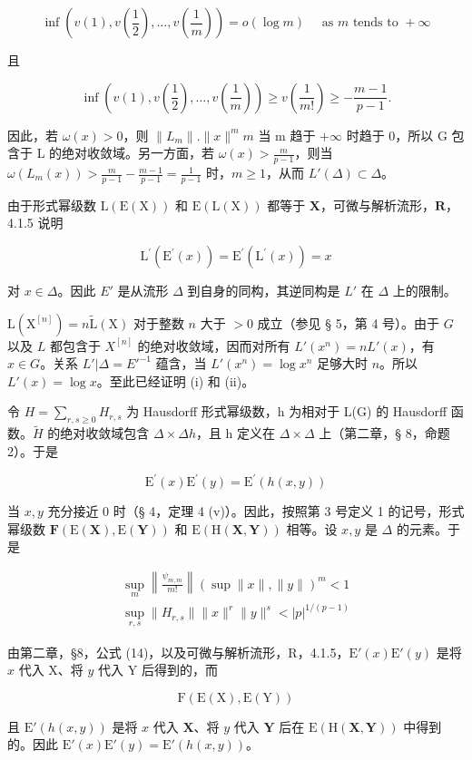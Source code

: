 \[
\inf \left(v (1), v \left(\frac {1}{2}\right), \dots , v \left(\frac {1}{m}\right)\right) = o (\log m) \quad \text { as   } m \text {   tends   to   } + \infty
\]

且

\[
\inf \left(v (1), v \left(\frac {1}{2}\right), \dots , v \left(\frac {1}{m}\right)\right) \geqslant v \left(\frac {1}{m !}\right) \geqslant - \frac {m - 1}{p - 1}.
\]

因此，若 \(\omega(x) > 0\)，则 \(\|L_m\|. \|x\|^m\)\(m\) 当 m 趋于  \(+\infty\) 时趋于 0，所以 G 包含于 L 的绝对收敛域。另一方面，若 \(\omega(x) > \frac{m}{p-1}\)，则当 \(\omega(L_m(x)) > \frac{m}{p-1} - \frac{m-1}{p-1} = \frac{1}{p-1}\) 时，\(m \geqslant 1\)，从而 \(L'(\Delta) \subset \Delta\)。

由于形式幂级数 \(\mathrm{L}(\mathrm{E}(\mathrm{X}))\) 和 \(\mathrm{E}(\mathrm{L}(\mathrm{X}))\) 都等于 \(\mathbf{X}\)，可微与解析流形，\(\mathbf{R}\)，4.1.5 说明

\[
\mathrm{L} ^ {\prime} (\mathrm{E} ^ {\prime} (x)) = \mathrm{E} ^ {\prime} (\mathrm{L} ^ {\prime} (x)) = x
\]

对 \(x \in \Delta\)。因此 \(E'\) 是从流形 \(\Delta\) 到自身的同构，其逆同构是 \(L'\) 在 \(\Delta\) 上的限制。

\(\mathrm{L}(\mathrm{X}^{[n]}) = n\tilde{\mathrm{L}}(\mathrm{X})\) 对于整数 \(n\) 大于 \(> 0\) 成立（参见 § 5，第 4 号）。由于 \(G\) 以及 \(L\) 都包含于 \(X^{[n]}\) 的绝对收敛域，因而对所有 \(L'(x^n) = nL'(x)\)，有 \(x \in G\)。关系 \(L'| \Delta = E'^{-1}\) 蕴含，当 \(L'(x^n) = \log x^n\) 足够大时 \(n\)。所以 \(L'(x) = \log x\)。至此已经证明 (i) 和 (ii)。

令 \(H = \sum_{r,s \geq 0} H_{r,s}\) 为 Hausdorff 形式幂级数，h 为相对于 L(G) 的 Hausdorff 函数。\(\tilde{H}\) 的绝对收敛域包含 \(\Delta \times \Delta\)\(h\)，且 h 定义在 \(\Delta \times \Delta\) 上（第二章，§ 8，命题 2）。于是

\[
\mathrm{E} ^ {\prime} (x) \mathrm{E} ^ {\prime} (y) = \mathrm{E} ^ {\prime} (h (x, y))
\]

当 \(x, y\) 充分接近 0 时（§ 4，定理 4 (v)）。因此，按照第 3 号定义 1 的记号，形式幂级数 \(\mathbf{F}(\mathrm{E}(\mathbf{X}), \mathrm{E}(\mathbf{Y}))\) 和 \(\mathrm{E}(\mathrm{H}(\mathbf{X}, \mathbf{Y}))\) 相等。设 \(x, y\) 是 \(\Delta\) 的元素。于是

\[
\begin{array}{l} \sup _ {m} \left\| \frac {\psi_ {m , m}}{m !} \right\| (\sup \| x \|, \| y \|) ^ {m} <   1 \\ \sup _ {r, s} \| H _ {r, s} \| \| x \| ^ {r} \| y \| ^ {s} <   | p | ^ {1 / (p - 1)} \end{array}
\]

由第二章，§8，公式 (14)，以及可微与解析流形，R，4.1.5，\(\mathrm{E}'(x)\mathrm{E}'(y)\) 是将 \(x\) 代入 X、将 \(y\) 代入 Y 后得到的，而

\[
\mathrm{F} (\mathrm{E} (\mathrm{X}), \mathrm{E} (\mathrm{Y}))
\]

且 \(\mathrm{E}'(h(x,y))\) 是将 \(x\) 代入 \(\mathbf{X}\)、将 \(y\) 代入 \(\mathbf{Y}\) 后在 \(\mathrm{E}(\mathrm{H}(\mathbf{X},\mathbf{Y}))\) 中得到的。因此 \(\mathrm{E}'(x)\mathrm{E}'(y) = \mathrm{E}'(h(x,y))\)。

